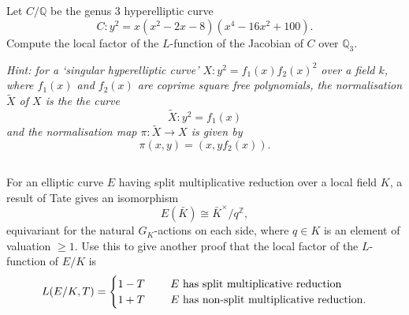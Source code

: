 \documentclass[12pt]{amsart}
\numberwithin{equation}{section}
\theoremstyle{remark}
\theoremstyle{definition}
\theoremstyle{definition}
\theoremstyle{definition}
\theoremstyle{definition}
\theoremstyle{definition}
\theoremstyle{definition}
\begin{document}
\subsection{} Let $C/\mathbb{Q}$ be the genus $3$ hyperelliptic curve 
\[C:y^2=x\left(x^2-2x-8\right)\left(x^4-16x^2+100\right).\]
Compute the local factor of the $L$-function of the Jacobian of $C$ over $\mathbb{Q}_3$. 

\textit{Hint: for a `singular hyperelliptic curve' $X:y^2=f_1(x)f_2(x)^2$ over a field $k$, where $f_1(x)$ and $f_2(x)$ are coprime square free polynomials, the normalisation $\tilde{X}$ of $X$ is the the curve
\[\tilde{X}:y^2=f_1(x)\]
and the normalisation map $\pi:\tilde{X}\rightarrow X$ is given by
\[\pi(x,y)=\left(x,yf_2(x)\right).\]}

\subsection{} For an elliptic curve $E$ having split multiplicative reduction over a local field $K$, a result of Tate gives an isomorphism
\[E(\bar{K})\cong \bar{K}^\times/q^\mathbb{Z},\]
equivariant for the natural $G_K$-actions on each side,
where $q\in K$ is an element of valuation $\geq 1$. Use this to give another proof that the local factor of the $L$-function of $E/K$ is
\[L(E/K,T)=\begin{cases}
1-T~~&~~E\textup{ has split  multiplicative reduction}\\
1+T~~&~~E\textup{ has non-split multiplicative reduction}.
\end{cases}\]

\newpage 
\end{document}
